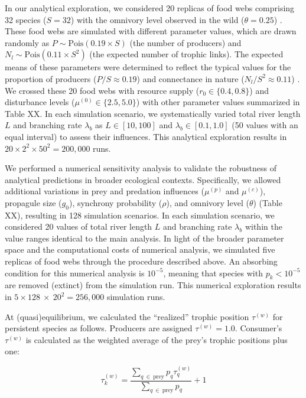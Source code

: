 \documentclass[11pt, class=article, crop=false]{standalone}
\begin{document}
In our analytical exploration, we considered 20 replicas of food webs comprising 32 species ($S = 32$) with the omnivory level observed in the wild ($\theta = 0.25$) \cite{johnson_trophic_2014}.
These food webs are simulated with different parameter values, which are drawn randomly as $P \sim \mbox{Pois}(0.19 \times S)$ (the number of producers) and $N_l \sim \mbox{Pois}(0.11 \times S^2)$ (the expected number of trophic links).
The expected means of these parameters were determined to reflect the typical values for the proportion of producers ($P / S \approx 0.19$) \citep{briand_community_1984} and connectance in nature ($N_l / S^2 \approx 0.11$) \citep{dunne_food-web_2002}.
We crossed these 20 food webs with resource supply ($r_0 \in \{0.4, 0.8\}$) and disturbance levels ($\mu^{(0)} \in \{2.5, 5.0\}$) with other parameter values summarized in Table XX.
In each simulation scenario, we systematically varied total river length $L$ and branching rate $\lambda_b$ as $L \in [10, 100]$ and $\lambda_b \in [0.1, 1.0]$ (50 values with an equal interval) to assess their influences.
This analytical exploration results in $20 \times 2^2 \times 50^2 = 200,000$ runs.

We performed a numerical sensitivity analysis to validate the robustness of analytical predictions in broader ecological contexts.
Specifically, we allowed additional variations in prey and predation influences ($\mu^{(p)}$ and $\mu^{(c)}$), propagule size ($g_0$), synchrony probability ($\rho$), and omnivory level ($\theta$) (Table XX), resulting in 128 simulation scenarios.
In each simulation scenario, we considered 20 values of total river length $L$ and branching rate $\lambda_b$ within the value ranges identical to the main analysis.
In light of the broader parameter space and the computational costs of numerical analysis, we simulated five replicas of food webs through the procedure described above.
An absorbing condition for this numerical analysis is $10^{-5}$, meaning that species with $p_k < 10^{-5}$ are removed (extinct) from the simulation run.
This numerical exploration results in $5 \times 128~\times~20^2 = 256,000$ simulation runs.

At (quasi)equilibrium, we calculated the ``realized'' trophic position $\tau^{(w)}$ for persistent species as follows.
Producers are assigned $\tau^{(w)} = 1.0$.
Consumer's $\tau^{(w)}$ is calculated as the weighted average of the prey's trophic positions plus one:

\begin{equation}
    \tau^{(w)}_k = \frac{\sum_{q~\in~\text{prey}} p_{q} \tau^{(w)}_q}{\sum_{q~\in~\text{prey}} p_{q}} + 1
\end{equation}
\end{document}
